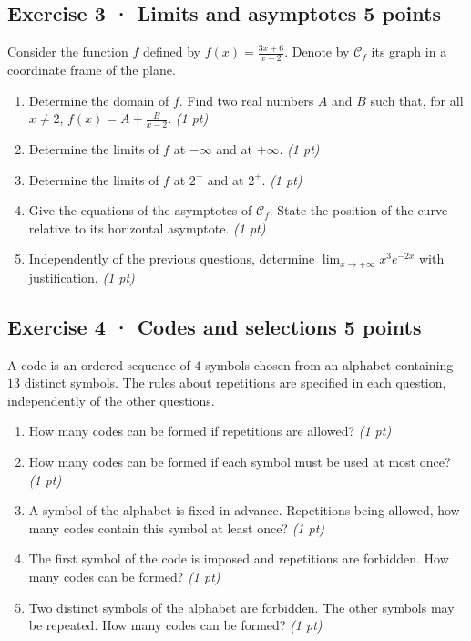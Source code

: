 \subsection*{Exercise 3 · Limits and asymptotes \hfill 5 points}Consider the function $f$ defined by $f(x)=\frac{3x+6}{x-2}$. Denote by $\mathcal C_f$ its graph in a coordinate frame of the plane.

\begin{enumerate}

\item Determine the domain of $f$. Find two real numbers $A$ and $B$ such that, for all $x\ne2$, $f(x)=A+\frac B{x-2}$. \hfill\textit{(1 pt)}

\item Determine the limits of $f$ at $-\infty$ and at $+\infty$. \hfill\textit{(1 pt)}

\item Determine the limits of $f$ at $2^-$ and at $2^+$. \hfill\textit{(1 pt)}

\item Give the equations of the asymptotes of $\mathcal C_f$. State the position of the curve relative to its horizontal asymptote. \hfill\textit{(1 pt)}

\item Independently of the previous questions, determine $\displaystyle\lim_{x\to+\infty}x^{3}e^{-2x}$ with justification. \hfill\textit{(1 pt)}

\end{enumerate}

\subsection*{Exercise 4 · Codes and selections \hfill 5 points}A code is an ordered sequence of $4$ symbols chosen from an alphabet containing $13$ distinct symbols. The rules about repetitions are specified in each question, independently of the other questions.

\begin{enumerate}

\item How many codes can be formed if repetitions are allowed? \hfill\textit{(1 pt)}

\item How many codes can be formed if each symbol must be used at most once? \hfill\textit{(1 pt)}

\item A symbol of the alphabet is fixed in advance. Repetitions being allowed, how many codes contain this symbol at least once? \hfill\textit{(1 pt)}

\item The first symbol of the code is imposed and repetitions are forbidden. How many codes can be formed? \hfill\textit{(1 pt)}

\item Two distinct symbols of the alphabet are forbidden. The other symbols may be repeated. How many codes can be formed? \hfill\textit{(1 pt)}

\end{enumerate}

